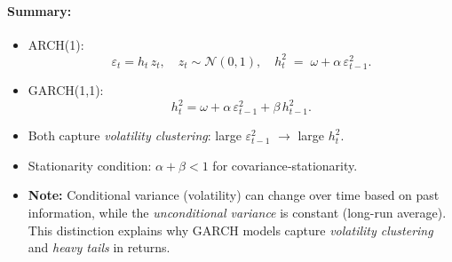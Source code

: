 \documentclass[11pt]{amsart}
\begin{document}
\paragraph{Summary:}
\begin{itemize}[noitemsep,left=0pt]
  \item ARCH(1):
    \[
      \varepsilon_t = h_t\,z_t,\quad z_t \sim \mathcal{N}(0,1),
      \quad
      h_t^2 \;=\; \omega + \alpha\,\varepsilon_{t-1}^2.
    \]
  \item GARCH(1,1):
    \[
      h_t^2 = \omega + \alpha\,\varepsilon_{t-1}^2 + \beta\,h_{t-1}^2.
    \]
  \item Both capture \emph{volatility clustering}: large $\varepsilon_{t-1}^2$ $\rightarrow$ large $h_t^2$.
  \item Stationarity condition: $\alpha + \beta < 1$ for covariance‐stationarity.
  \item \textbf{Note:} Conditional variance (volatility) can change over time based on past information, while the \emph{unconditional variance} is constant (long-run average). This distinction explains why GARCH models capture \emph{volatility clustering} and \emph{heavy tails} in returns.


\end{itemize}
\end{document}
